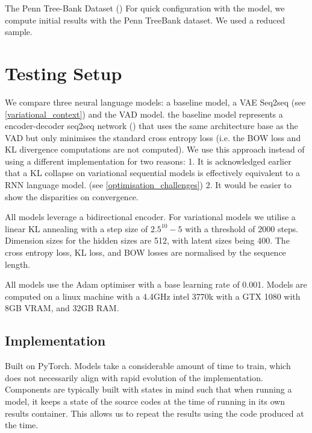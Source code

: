 \documentclass[12pt,twoside]{report}
\begin{document}

The Penn Tree-Bank Dataset (\cite{marcus_building_2002}) 
For quick configuration with the model, we compute initial results with the Penn TreeBank dataset. We used a reduced sample.

\section{Testing Setup}

We compare three neural language models: a baseline model, a VAE Seq2seq (see \ref{variational_context}) and the VAD model. the baseline model represents a encoder-decoder seq2seq network (\cite{serban_hierarchical_2016}) that uses the same architecture base as the VAD but only minimises the standard cross entropy loss (i.e. the BOW loss and KL divergence computations are not computed). We use this approach instead of using a different implementation for two reasons: 1. It is acknowledged earlier that a KL collapse on variational sequential models is effectively equivalent to a RNN language model. (see \ref{optimisation_challenges}) 2. It would be easier to show the disparities on convergence.

All models leverage a bidirectional encoder. For variational models we utilise a linear KL annealing with a step size of $2.5^10-5$ with a threshold of 2000 steps. Dimension sizes for the hidden sizes are 512, with latent sizes being 400. The cross entropy loss, KL loss, and BOW losses are normalised by the sequence length. 

All models use the Adam optimiser with a base learning rate of 0.001. Models are computed on a linux machine with a  4.4GHz intel 3770k with a GTX 1080 with 8GB VRAM, and 32GB RAM.

\subsection{Implementation}

Built on PyTorch. Models take a considerable amount of time to train, which does not necessarily align with rapid evolution of the implementation. Components are typically built with states in mind such that when running a model, it keeps a state of the source codes at the time of running in its own results container. This allows us to repeat the results using the code produced at the time.

\end{document}
